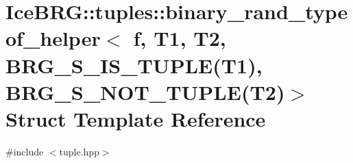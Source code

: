 \hypertarget{structIceBRG_1_1tuples_1_1binary__rand__typeof__helper_3_01f_00_01T1_00_01T2_00_01BRG__S__IS__TU0ef4e05af1a56449fbbcc207cdc65c2c}{}\section{Ice\+B\+R\+G\+:\+:tuples\+:\+:binary\+\_\+rand\+\_\+typeof\+\_\+helper$<$ f, T1, T2, B\+R\+G\+\_\+\+S\+\_\+\+I\+S\+\_\+\+T\+U\+P\+L\+E(T1), B\+R\+G\+\_\+\+S\+\_\+\+N\+O\+T\+\_\+\+T\+U\+P\+L\+E(T2)$>$ Struct Template Reference}
\label{structIceBRG_1_1tuples_1_1binary__rand__typeof__helper_3_01f_00_01T1_00_01T2_00_01BRG__S__IS__TU0ef4e05af1a56449fbbcc207cdc65c2c}


{\ttfamily \#include $<$tuple.\+hpp$>$}

